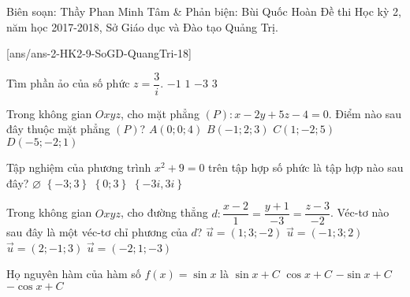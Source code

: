 
\begin{name}
{Biên soạn: Thầy Phan Minh Tâm \& Phản biện: Bùi Quốc Hoàn}
{Đề thi Học kỳ 2, năm học 2017-2018, Sở Giáo dục và Đào tạo Quảng Trị.}
\end{name}
\setcounter{ex}{0}
[ans/ans-2-HK2-9-SoGD-QuangTri-18]
\begin{ex}%
	Tìm phần ảo của số phức $ z=\dfrac{3}{i} $.
	\choice
	{$ -1 $}
	{$ 1 $}
	{\True $ -3 $}
	{$ 3 $}
\end{ex}
\begin{ex}%
	Trong không gian $ Oxyz $, cho mặt phẳng $ (P)\colon x-2y+5z-4=0 $. Điểm nào sau đây thuộc mặt phẳng $ (P) $?
	\choice
	{$ A(0;0;4) $}
	{$ B(-1;2;3) $}
	{$ C(1;-2;5) $}
	{\True$ D(-5;-2;1) $}
\end{ex}
\begin{ex}%
	Tập nghiệm của phương trình $ x^2+9=0 $ trên tập hợp số phức là tập hợp nào sau đây?
	\choice
	{$ \varnothing $}
	{$ \left\lbrace -3;3 \right\rbrace  $}
	{$ \left\lbrace 0;3\right\rbrace  $}
	{\True $ \left\lbrace -3i, 3i\right\rbrace  $}
\end{ex}
\begin{ex}%
	Trong không gian $ Oxyz $, cho đường thẳng $ d\colon \dfrac{x-2}{1}=\dfrac{y+1}{-3}=\dfrac{z-3}{-2} $. Véc-tơ nào sau đây là một véc-tơ chỉ phương của $ d $?
	\choice
	{$ \vec{u}=(1;3;-2) $}
	{\True $ \vec{u}=(-1;3;2) $}
	{$ \vec{u}=(2;-1;3) $}
	{$ \vec{u}=(-2;1;-3) $}
\end{ex}
\begin{ex}%
	Họ nguyên hàm của hàm số $ f(x)=\sin x $ là
	\choice
	{$ \sin x+C $}
	{$ \cos x+C $}
	{$ -\sin x+C $}
	{\True$ -\cos x+C $}
\end{ex}

